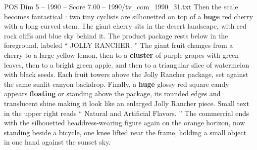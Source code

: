\begin{textsample}{POS Dim 5 – 1990 – Score 7.00 – 1990/tv\_com\_1990\_31.txt}
Then the scale becomes fantastical : two tiny cyclists are silhouetted on top of a \textbf{huge} red cherry with a long curved stem.
The giant cherry sits in the desert landscape, with red rock cliffs and blue sky behind it.
The product package rests below in the foreground, labeled “ JOLLY RANCHER. ” The giant fruit changes from a cherry to a large yellow lemon, then to a \textbf{cluster} of purple grapes with green leaves, then to a bright green apple, and then to a triangular slice of watermelon with black seeds.
Each fruit towers above the Jolly Rancher package, set against the same sunlit canyon backdrop.
Finally, a \textbf{huge} glossy red square candy appears \textbf{floating} or standing above the package, its rounded edges and translucent shine making it look like an enlarged Jolly Rancher piece.
Small text in the upper right reads “ Natural and Artificial Flavors. ” The commercial ends with the silhouetted headdress-wearing figure again on the orange horizon, now standing beside a bicycle, one knee lifted near the frame, holding a small object in one hand against the sunset sky.

\end{textsample}
